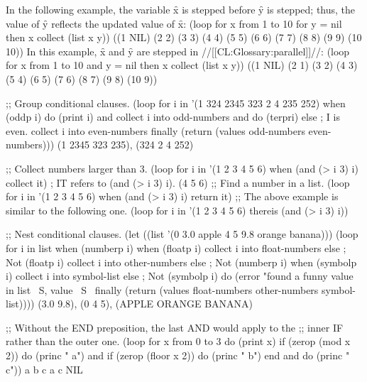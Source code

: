In the following example, the variable \f{x} is stepped before \f{y} is stepped; thus, the value of \f{y} reflects the updated value of \f{x}:
  \code
 (loop for x from 1 to 10 
       for y = nil then x 
       collect (list x y)) \EV ((1 NIL) (2 2) (3 3) (4 4) (5 5) (6 6) (7 7) (8 8) (9 9) (10 10)) \endcode
  In this example, \f{x} and \f{y} are stepped in //[[CL:Glossary:parallel]]//:
  \code
 (loop for x from 1 to 10 
       and y = nil then x 
       collect (list x y)) \EV ((1 NIL) (2 1) (3 2) (4 3) (5 4) (6 5) (7 6) (8 7) (9 8) (10 9)) \endcode

 \code ;; Group conditional clauses.
 (loop for i in '(1 324 2345 323 2 4 235 252)
       when (oddp i)
         do (print i)
         and collect i into odd-numbers
         and do (terpri)
       else                              ; I is even.
         collect i into even-numbers
       finally
         (return (values odd-numbers even-numbers)))   \OUT  {}  \OUT  {}  \OUT  {}  \EV (1 2345 323 235), (324 2 4 252)

;; Collect numbers larger than 3.
 (loop for i in '(1 2 3 4 5 6)
       when (and (> i 3) i)
       collect it)                      ; IT refers to (and (> i 3) i). \EV (4 5 6)
  ;; Find a number in a list.
 (loop for i in '(1 2 3 4 5 6)
       when (and (> i 3) i)
       return it) 
      ;; The above example is similar to the following one.
 (loop for i in '(1 2 3 4 5 6)
       thereis (and (> i 3) i)) 

\medbreak ;; Nest conditional clauses.
 (let ((list '(0 3.0 apple 4 5 9.8 orange banana)))
   (loop for i in list
         when (numberp i)
           when (floatp i)
             collect i into float-numbers
           else                                  ; Not (floatp i)
             collect i into other-numbers
         else                                    ; Not (numberp i)
           when (symbolp i) 
             collect i into symbol-list
           else                                  ; Not (symbolp i)
             do (error "found a funny value in list ~S, value ~S~%
         finally (return (values float-numbers other-numbers symbol-list)))) \EV (3.0 9.8), (0 4 5), (APPLE ORANGE BANANA)

;; Without the END preposition, the last AND would apply to the ;; inner IF rather than the outer one.
 (loop for x from 0 to 3 
       do (print x)
       if (zerop (mod x 2))
         do (princ " a")
          and if (zerop (floor x 2))
                do (princ " b")
                end
          and do (princ " c"))   a b c     a c   \EV NIL \endcode
  \endsubsubsection%

